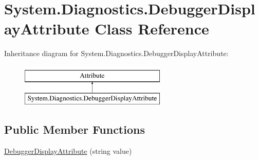 \hypertarget{classSystem_1_1Diagnostics_1_1DebuggerDisplayAttribute}{}\section{System.\+Diagnostics.\+Debugger\+Display\+Attribute Class Reference}
\label{classSystem_1_1Diagnostics_1_1DebuggerDisplayAttribute}
Inheritance diagram for System.\+Diagnostics.\+Debugger\+Display\+Attribute\+:\begin{figure}[H]
\begin{center}
\leavevmode
\includegraphics[height=2.000000cm]{classSystem_1_1Diagnostics_1_1DebuggerDisplayAttribute}
\end{center}
\end{figure}
\subsection*{Public Member Functions}
\begin{DoxyCompactItemize}
\item 
\hyperlink{classSystem_1_1Diagnostics_1_1DebuggerDisplayAttribute_ab455cb09a7bcae8cf3af0e679c14ffe7_ab455cb09a7bcae8cf3af0e679c14ffe7}{Debugger\+Display\+Attribute} (string value)
\end{DoxyCompactItemize}
